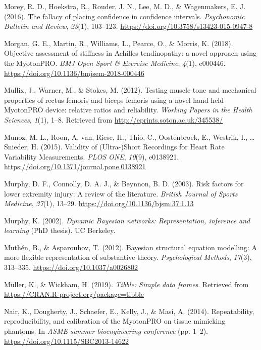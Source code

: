\documentclass[
  english,
  man,floatsintext]{apa6}
\begin{document}
\leavevmode\hypertarget{ref-Morey2016}{}%
Morey, R. D., Hoekstra, R., Rouder, J. N., Lee, M. D., \& Wagenmakers, E. J. (2016). The fallacy of placing confidence in confidence intervals. \emph{Psychonomic Bulletin and Review}, \emph{23}(1), 103--123. \url{https://doi.org/10.3758/s13423-015-0947-8}

\leavevmode\hypertarget{ref-Morgan2018}{}%
Morgan, G. E., Martin, R., Williams, L., Pearce, O., \& Morris, K. (2018). Objective assessment of stiffness in Achilles tendinopathy: a novel approach using the MyotonPRO. \emph{BMJ Open Sport \& Exercise Medicine}, \emph{4}(1), e000446. \url{https://doi.org/10.1136/bmjsem-2018-000446}

\leavevmode\hypertarget{ref-Mullix2012}{}%
Mullix, J., Warner, M., \& Stokes, M. (2012). Testing muscle tone and mechanical properties of rectus femoris and biceps femoris using a novel hand held MyotonPRO device: relative ratios and reliability. \emph{Working Papers in the Health Sciences}, \emph{1}(1), 1--8. Retrieved from \url{http://eprints.soton.ac.uk/345538/}

\leavevmode\hypertarget{ref-Munoz2015}{}%
Munoz, M. L., Roon, A. van, Riese, H., Thio, C., Oostenbroek, E., Westrik, I., \ldots{} Snieder, H. (2015). Validity of (Ultra-)Short Recordings for Heart Rate Variability Measurements. \emph{PLOS ONE}, \emph{10}(9), e0138921. \url{https://doi.org/10.1371/journal.pone.0138921}

\leavevmode\hypertarget{ref-Murphy2003}{}%
Murphy, D. F., Connolly, D. A. J., \& Beynnon, B. D. (2003). Risk factors for lower extremity injury: A review of the literature. \emph{British Journal of Sports Medicine}, \emph{37}(1), 13--29. \url{https://doi.org/10.1136/bjsm.37.1.13}

\leavevmode\hypertarget{ref-Murphy2002}{}%
Murphy, K. (2002). \emph{Dynamic Bayesian networks: Representation, inference and learning} (PhD thesis). UC Berkeley.

\leavevmode\hypertarget{ref-Muthen2012}{}%
Muthén, B., \& Asparouhov, T. (2012). Bayesian structural equation modelling: A more flexible representation of substantive theory. \emph{Psychological Methods}, \emph{17}(3), 313--335. \url{https://doi.org/10.1037/a0026802}

\leavevmode\hypertarget{ref-R-tibble}{}%
Müller, K., \& Wickham, H. (2019). \emph{Tibble: Simple data frames}. Retrieved from \url{https://CRAN.R-project.org/package=tibble}

\leavevmode\hypertarget{ref-Nair2014}{}%
Nair, K., Dougherty, J., Schaefer, E., Kelly, J., \& Masi, A. (2014). Repeatability, reproducibility, and calibration of the MyotonPRO on tissue mimicking phantoms. In \emph{ASME summer bioengineering conference} (pp. 1--2). \url{https://doi.org/10.1115/SBC2013-14622}
\end{document}
